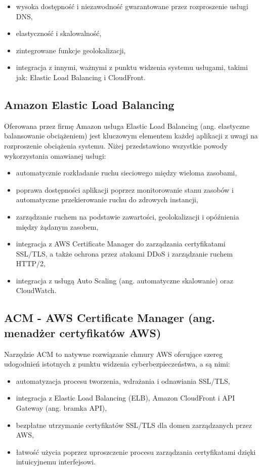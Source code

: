 \documentclass[12pt,oneside]{book}
\begin{document}
    \begin{itemize}
        \item wysoka dostępność i niezawodność gwarantowane przez rozproszenie usługi DNS,
        \item elastyczność i skalowalność,
        \item zintegrowane funkcje geolokalizacji,
        \item integracja z innymi, ważnymi z punktu widzenia systemu usługami, takimi jak: Elastic Load Balancing i CloudFront. \cite{aws.route53}
    \end{itemize}

    \subsection{Amazon Elastic Load Balancing}
    Oferowana przez firmę Amazon usługa Elastic Load Balancing (ang. elastyczne balansowanie obciążeniem) jest kluczowym elementem każdej aplikacji z uwagi na rozproszenie obciążenia systemu. Niżej przedstawiono wszystkie powody wykorzystania omawianej usługi:

    \begin{itemize}
        \item automatycznie rozkładanie ruchu sieciowego między wieloma zasobami,
        \item poprawa dostępności aplikacji poprzez monitorowanie stanu zasobów i automatyczne przekierowanie ruchu do zdrowych instancji,
        \item zarządzanie ruchem na podstawie zawartości, geolokalizacji i opóźnienia między żądanym zasobem,
        \item integracja z AWS Certificate Manager do zarządzania certyfikatami SSL/TLS, a także ochrona przez atakami DDoS i zarządzanie ruchem HTTP/2,
        \item integracja z usługą Auto Scaling (ang. automatyczne skalowanie) oraz CloudWatch. \cite{aws.elb}
    \end{itemize}

    \subsection{ACM - AWS Certificate Manager (ang. menadżer certyfikatów AWS)}
    Narzędzie ACM to natywne rozwiązanie chmury AWS oferujące szereg udogodnień istotnych z punktu widzenia cyberbezpieczeństwa, a są nimi:

    \begin{itemize}
        \item automatyzacja procesu tworzenia, wdrażania i odnawiania SSL/TLS,
        \item integracja z Elastic Load Balancing (ELB), Amazon CloudFront i API Gateway (ang. bramka API),
        \item bezpłatne utrzymanie certyfikatów SSL/TLS dla domen zarządzanych przez AWS,
        \item łatwość użycia poprzez uproszczenie procesu zarządzania certyfikatami dzięki intuicyjnemu interfejsowi. \cite{aws.acm}
    \end{itemize}
\end{document}
